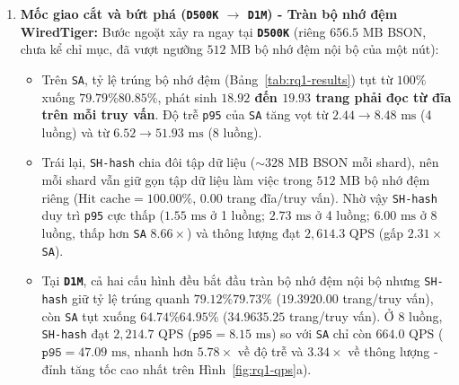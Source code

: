 \begin{enumerate}[leftmargin=0.8cm, itemsep=4pt]
  \item \textbf{Mốc giao cắt và bứt phá (\texttt{D500K} $\rightarrow$ \texttt{D1M}) - Tràn bộ nhớ đệm WiredTiger:} Bước ngoặt xảy ra ngay tại \textbf{\texttt{D500K}} (riêng $656.5\text{ MB}$ BSON, chưa kể chỉ mục, đã vượt ngưỡng $512\text{ MB}$ bộ nhớ đệm nội bộ của một nút):
  \begin{itemize}[leftmargin=0.6cm, itemsep=3pt]
    \item Trên \texttt{SA}, tỷ lệ trúng bộ nhớ đệm (Bảng~\ref{tab:rq1-results}) tụt từ $100\%$ xuống \textbf{$79.79\%$\textendash $80.85\%$}, phát sinh \textbf{$18.92$ đến $19.93$ trang phải đọc từ đĩa trên mỗi truy vấn}. Độ trễ \texttt{p95} của \texttt{SA} tăng vọt từ $2.44 \rightarrow 8.48\text{ ms}$ (4 luồng) và từ $6.52 \rightarrow 51.93\text{ ms}$ (8 luồng).
    \item Trái lại, \texttt{SH-hash} chia đôi tập dữ liệu ($\sim 328\text{ MB}$ BSON mỗi shard), nên mỗi shard vẫn giữ gọn tập dữ liệu làm việc trong $512\text{ MB}$ bộ nhớ đệm riêng ($\text{Hit cache} = 100.00\%$, $0.00$ trang đĩa/truy vấn). Nhờ vậy \texttt{SH-hash} duy trì \texttt{p95} cực thấp ($1.55\text{ ms}$ ở 1 luồng; $2.73\text{ ms}$ ở 4 luồng; $6.00\text{ ms}$ ở 8 luồng, thấp hơn \texttt{SA} \textbf{$8.66\times$}) và thông lượng đạt $2{,}614.3\text{ QPS}$ (gấp \textbf{$2.31\times$} \texttt{SA}).
    \item Tại \textbf{\texttt{D1M}}, cả hai cấu hình đều bắt đầu tràn bộ nhớ đệm nội bộ nhưng \texttt{SH-hash} giữ tỷ lệ trúng quanh \textbf{$79.12\%$\textendash $79.73\%$} ($19.39$\textendash $20.00$ trang/truy vấn), còn \texttt{SA} tụt xuống \textbf{$64.74\%$\textendash $64.95\%$} ($34.96$\textendash $35.25$ trang/truy vấn). Ở 8 luồng, \texttt{SH-hash} đạt $2{,}214.7\text{ QPS}$ ($\texttt{p95} = 8.15\text{ ms}$) so với \texttt{SA} chỉ còn $664.0\text{ QPS}$ ($\texttt{p95} = 47.09\text{ ms}$, nhanh hơn \textbf{$5.78\times$} về độ trễ và \textbf{$3.34\times$} về thông lượng - đỉnh tăng tốc cao nhất trên Hình~\ref{fig:rq1-qps}a).

\end{itemize}
\end{enumerate}
